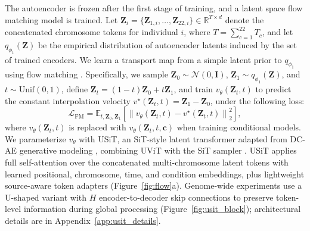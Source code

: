 \documentclass{article}
\begin{document}
The autoencoder is frozen after the first stage of training, and a latent space flow matching model is trained. Let \(\boldsymbol Z_i=\{\boldsymbol Z_{1,i},\ldots,\boldsymbol Z_{22,i}\}\in\mathbb R^{T\times d}\) denote the concatenated chromosome tokens for individual \(i\), where \(T=\sum_{c=1}^{22} T_c\), and let \(q_{\phi_1}(\boldsymbol Z)\) be the empirical distribution of autoencoder latents induced by the set of trained encoders. We learn a transport map from a simple latent prior to \(q_{\phi_1}\) using flow matching \cite{lipman2022flow}. 
Specifically, we sample \(\boldsymbol Z_0\sim\mathcal N(0,\boldsymbol I)\), \(\boldsymbol Z_1\sim q_{\phi_1}(\boldsymbol Z)\), and \(t\sim\mathrm{Unif}(0,1)\), define \(\boldsymbol Z_t=(1-t)\boldsymbol Z_0+t\boldsymbol Z_1\), and train \(v_\theta(\boldsymbol Z_t,t)\) to predict the constant interpolation velocity \(v^\star(\boldsymbol Z_t,t)=\boldsymbol Z_1-\boldsymbol Z_0\), under the following loss:
\[
\mathcal L_{\mathrm{FM}}
=
\mathbb E_{t,\boldsymbol Z_0,\boldsymbol Z_1}
\left[
\left\|v_\theta(\boldsymbol Z_t,t)-v^\star(\boldsymbol Z_t,t)\right\|_2^2
\right],
\]
where \(v_\theta(\boldsymbol{Z}_t,t)\) is replaced with \(v_\theta(\boldsymbol Z_t,t,\boldsymbol c)\) when training conditional models. We parameterize \(v_\theta\) with USiT, an SiT-style latent transformer adapted from DC-AE generative modeling \cite{chen2024deep}, combining UViT \cite{bao2023all} with the SiT sampler \cite{ma2024sit}. USiT applies full self-attention over the concatenated multi-chromosome latent tokens with learned positional, chromosome, time, and condition embeddings, plus lightweight source-aware token adapters (Figure~\ref{fig:flow}a). Genome-wide experiments use a U-shaped variant with \(H\) encoder-to-decoder skip connections to preserve token-level information during global processing (Figure~\ref{fig:usit_block}); architectural details are in Appendix~\ref{app:usit_details}.
\end{document}
